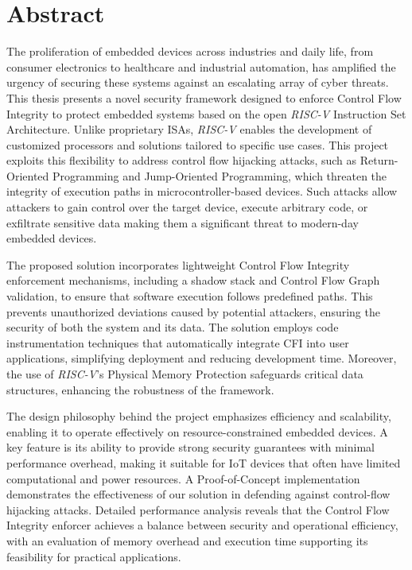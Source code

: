 \chapter*{Abstract}
\label{cha:abstract}

The proliferation of embedded devices across industries and daily life, from consumer
electronics to healthcare and industrial automation, has amplified the urgency
of securing these systems against an escalating array of cyber threats. This thesis
presents a novel security framework designed to enforce Control Flow Integrity to
protect embedded systems based on the open \textit{RISC-V} Instruction Set
Architecture. Unlike proprietary ISAs, \textit{RISC-V} enables the development of
customized processors and solutions tailored to specific use cases. This project
exploits this flexibility to address control flow hijacking attacks, such as Return-Oriented
Programming and Jump-Oriented Programming, which threaten the integrity of
execution paths in microcontroller-based devices. Such attacks allow attackers to
gain control over the target device, execute arbitrary code, or exfiltrate sensitive
data making them a significant threat to modern-day embedded devices.

The proposed solution incorporates lightweight Control Flow Integrity enforcement
mechanisms, including a shadow stack and Control Flow Graph validation, to ensure
that software execution follows predefined paths. This prevents unauthorized
deviations caused by potential attackers, ensuring the security of both the system
and its data. The solution employs code instrumentation techniques that
automatically integrate CFI into user applications, simplifying deployment and reducing
development time. Moreover, the use of \textit{RISC-V}'s Physical Memory
Protection safeguards critical data structures, enhancing the robustness of the framework.

The design philosophy behind the project emphasizes efficiency and scalability,
enabling it to operate effectively on resource-constrained embedded devices. A key
feature is its ability to provide strong security guarantees with minimal performance
overhead, making it suitable for IoT devices that often have limited
computational and power resources. A Proof-of-Concept implementation demonstrates
the effectiveness of our solution in defending against control-flow hijacking attacks.
Detailed performance analysis reveals that the Control Flow Integrity enforcer
achieves a balance between security and operational efficiency, with an evaluation
of memory overhead and execution time supporting its feasibility for practical applications.

